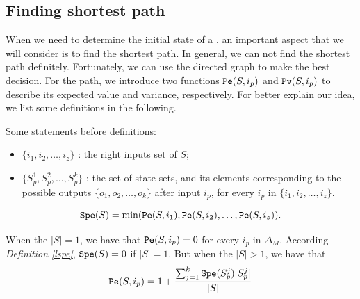 \subsection{Finding shortest path}
When we need to determine the initial state of a \BCN, an important aspect that we will consider is to find the shortest path. In general, we can not find the shortest path definitely.  Fortunately, we can use the directed graph to make the best decision. For the path, we introduce two functions $\Pe(S, i_p)$ and ${\tt Pv}(S, i_p)$ to describe its expected value and variance, respectively. For better explain our idea, we list some definitions in the following.



Some statements before definitions:
\begin{itemize}
  \item $\{i_1,i_2,\ldots, i_z\}$ : the right inputs set of $S$;
  \item $\{S_p^1,S_p^2,\ldots, S_p^k\}$ : the set of state sets, and its elements corresponding to the possible outputs $\{o_1,o_2,\ldots,o_k\}$ after input $i_p$, for every $i_p$ in $\{i_1,i_2,\ldots, i_z\}$.
\end{itemize} 
\begin{definition}[$\Spe(S)$] \label{lspe}
 \[{\tt Spe}(S)= \min({\tt Pe}(S, i_1),{\tt Pe}(S, i_2),\ldots,{\tt Pe}(S, i_z)).\] 
\end{definition}

\begin{definition}[$\Pe(S, i_p)$] 
When the $|S|=1$, we have that
${\tt Pe}(S, i_p)=0$  for every $i_p$ in $\Delta_M$. According {\em Definition \ref{lspe}}, ${\tt Spe}(S)=0$ if $|S|=1$. But when the $|S|>1$, 
we have that  
\[{\tt Pe}(S, i_p)=1 +\frac{\sum_{j=1}^k {\tt Spe}(S_p^j)|S_p^j|}{ |S|}\] 
\end{definition}

